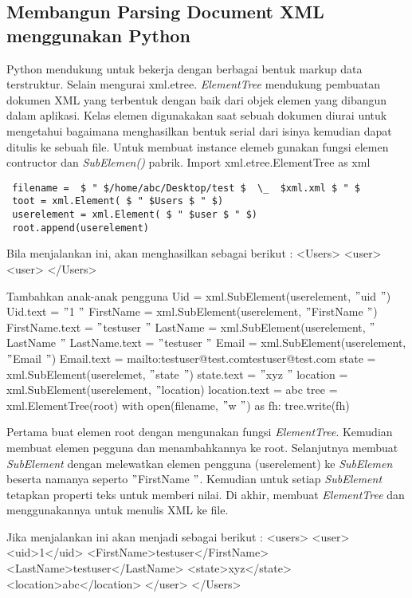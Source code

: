 \subsection{Membangun Parsing Document XML menggunakan Python} 
Python mendukung untuk bekerja dengan berbagai bentuk markup data terstruktur. Selain mengurai xml.etree. \textit{ElementTree} mendukung pembuatan dokumen XML yang terbentuk dengan baik dari objek elemen yang dibangun dalam aplikasi. Kelas elemen digunakakan saat sebuah dokumen diurai untuk mengetahui bagaimana menghasilkan bentuk serial dari isinya kemudian dapat ditulis ke sebuah file.  
Untuk membuat instance elemeb gunakan fungsi elemen contructor dan \textit{SubElemen()} pabrik. 
Import xml.etree.ElementTree as xml
\begin{verbatim}
 filename =  $ " $/home/abc/Desktop/test $  \_  $xml.xml $ " $ 
 toot = xml.Element( $ " $Users $ " $)
 userelement = xml.Element( $ " $user $ " $)
 root.append(userelement)
 \end{verbatim}
 
Bila menjalankan ini, akan menghasilkan sebagai berikut : 
 <Users>
 <user>
 <user>
 </Users>
 
Tambahkan anak-anak pengguna 
 Uid = xml.SubElement(userelement,  $ " $uid $ " $)
 Uid.text =  $ " $1 $ " $
 FirstName = xml.SubElement(userelement,  $ " $FirstName $ " $)
 FirstName.text =  $ " $testuser $ " $
 LastName = xml.SubElement(userelement,  $ " $LastName $ " $
 LastName.text =  $ " $testuser $ " $
 Email = xml.SubElement(userelement,  $ " $Email $ " $)
 Email.text = {mailto:testuser@test.com}{testuser@test.com}
 state = xml.SubElement(userelemet,  $ " $state $ " $)
 state.text =  $ " $xyz $ " $
 location = xml.SubElement(userelement,  $ " $location)
 location.text = abc
 tree = xml.ElementTree(root)
 with open(filename,  $ " $w $ " $) as fh:
 tree.write(fh)

 Pertama buat elemen root dengan mengunakan fungsi \textit{ElementTree}. Kemudian membuat elemen pegguna dan menambahkannya ke root. Selanjutnya membuat \textit{SubElement }dengan melewatkan elemen pengguna (userelement) ke \textit{SubElemen} beserta namanya seperto  $ " $FirstName $ " $. Kemudian untuk setiap \textit{SubElement} tetapkan properti teks untuk memberi nilai. Di akhir, membuat \textit{ElementTree} dan menggunakannya untuk menulis XML ke file. \par
 Jika menjalankan ini akan menjadi sebagai berikut : 
 <users>
 <user>
 <uid>1</uid>
 <FirstName>testuser</FirstName>
 <LastName>testuser</LastName>
 <state>xyz</state>
 <location>abc</location>
 </user>
 </Users>
 
